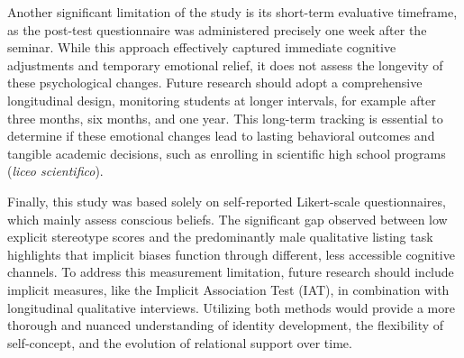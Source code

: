 Another significant limitation of the study is its short-term evaluative timeframe, as the post-test questionnaire was administered precisely one week after the seminar. While this approach effectively captured immediate cognitive adjustments and temporary emotional relief, it does not assess the longevity of these psychological changes. Future research should adopt a comprehensive longitudinal design, monitoring students at longer intervals, for example after three months, six months, and one year. This long-term tracking is essential to determine if these emotional changes lead to lasting behavioral outcomes and tangible academic decisions, such as enrolling in scientific high school programs (\textit{liceo scientifico}).

Finally, this study was based solely on self-reported Likert-scale questionnaires, which mainly assess conscious beliefs. The significant gap observed between low explicit stereotype scores and the predominantly male qualitative listing task highlights that implicit biases function through different, less accessible cognitive channels. To address this measurement limitation, future research should include implicit measures, like the Implicit Association Test (IAT), in combination with longitudinal qualitative interviews. Utilizing both methods would provide a more thorough and nuanced understanding of identity development, the flexibility of self-concept, and the evolution of relational support over time.